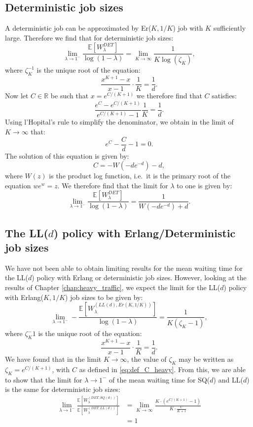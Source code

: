 \documentclass[12pt]{report}
\newcommand{\E}{\mathbb{E}}
\begin{document}
\subsection{Deterministic job sizes}
A deterministic job can be approximated by Er($K,1/K$) job with $K$ sufficiently large. Therefore we find that for deterministic job sizes:
$$
\lim_{\lambda \rightarrow 1^-} \frac{\mathbb{E}[W_\lambda^{DET}]}{\log(1-\lambda)}
=
\lim_{K\rightarrow \infty} \frac{1}{K \log(\zeta_K)},
$$
where $\zeta_K^{-1}$ is the unique root of the equation:
$$
\frac{x^{K+1}-x}{x-1} \cdot \frac{1}{K} = \frac{1}{d}.
$$
Now let $C \in \mathbb{R}$ be such that $x=e^{C/(K+1)}$ we therefore find that $C$ satisfies:
$$
\frac{e^C-e^{C/(K+1)}}{e^{C/(K+1)}-1} \frac{1}{K} = \frac{1}{d}.
$$
Using l'Hopital's rule to simplify the denominator, we obtain in the limit of $K\rightarrow \infty$ that:
$$
e^C-\frac{C}{d} - 1 = 0.
$$
The solution of this equation is given by:
\begin{equation}\label{eq:def_C_heavy}
C=-W(-de^{-d}) - d,
\end{equation}
where $W(z)$ is the product log function, i.e.~it is the primary root of the equation $we^w=z$. We therefore find that the limit for $\lambda$ to one is given by:
$$
\lim_{\lambda \rightarrow 1^-} \frac{\mathbb{E}[W_\lambda^{DET}]}{\log(1-\lambda)}
=
\frac{1}{W(-d e^{-d}) + d}.
$$

\subsection{The LL($d$) policy with Erlang/Deterministic job sizes}
We have not been able to obtain limiting results for the mean waiting time for the LL($d$) policy with Erlang or deterministic job sizes. However, looking at the results of Chapter \ref{chap:heavy_traffic}, we expect the limit for the LL($d$) policy with Erlang($K, 1/K$) job sizes to be given by:
$$
\lim_{\lambda\rightarrow 1^-} - \frac{\E[W_\lambda^{(LL(d), Er(K,1/K))}]}{\log(1-\lambda)}
=
\frac{1}{K(\zeta_K-1)},
$$
where $\zeta_K^-1$ is the unique root of the equation:
$$
\frac{x^{K+1}-x}{x-1} \cdot \frac{1}{K} = \frac{1}{d}.
$$
We have found that in the limit $K\rightarrow \infty$, the value of $\zeta_K$ may be written as $\zeta_K = e^{C/(K+1)}$, with $C$ as defined in \eqref{eq:def_C_heavy}. From this, we are able to show that the limit for $\lambda \rightarrow 1^-$ of the mean waiting time for SQ($d$) and LL($d$) is the same for deterministic job sizes:
\begin{align*}
	\lim_{\lambda\rightarrow 1^-} \frac{\E[W_\lambda^{(DET, SQ(d))}]}{\E[W_\lambda^{(DET, LL(d))}]}
	&= \lim_{K\rightarrow \infty} \frac{K \cdot (e^{C/(K+1)} - 1)}{K \cdot \frac{C}{K+1}}\\
	&= 1
\end{align*}
\end{document}
